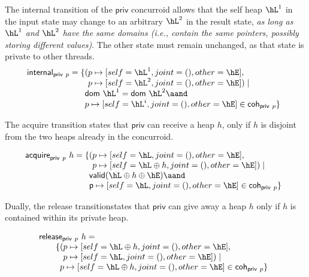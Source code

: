 The internal transition of the $\mathsf{priv}$ concurroid allows that
the self heap $\hL^1$ in the input state may change to an arbitrary
$\hL^2$ in the result state, \emph{as long as $\hL^1$ and $\hL^2$ have
  the same domains (i.e., contain the same pointers, possibly storing
  different values)}. The other state must remain unchanged, as that
state is private to other threads.
\[
\mathsf{internal}_{\mathsf{priv}\ p} = \{
\!\!\!\begin{array}[t]{l}
 (\!\!\!\begin{array}[t]{l}
    p \mapsto [self = \hL^1, joint=(), other=\hE], \\\relax
    p \mapsto [self = \hL^2, joint=(), other=\hE]) \mid 
 \end{array}\\\relax
    \mathsf{dom}\ \hL^1 = \mathsf{dom}\ \hL^2 \aand \hbox{}\\\relax
    p \mapsto [self = \hL^i, joint=(), other=\hE] \in \mathsf{coh}_{\mathsf{priv}\ p}\}
  \end{array}
\]

The acquire transition states that $\mathsf{priv}$ can receive a heap
$h$, only if $h$ is disjoint from the two heaps already in the
concurroid.

\[
\mathsf{acquire}_{\mathsf{priv}\ p}\ h = \{
\!\!\!\begin{array}[t]{l}
 (\!\!\!\begin{array}[t]{l}
    p \mapsto [self = \hL, joint=(), other=\hE], \\\relax
    p \mapsto [self = \hL \oplus h, joint=(), other=\hE]) \mid 
 \end{array}\\\relax
    \mathsf{valid} (\hL \oplus h \oplus \hE) \aand \hbox{}\\\relax
    \mathsf{p} \mapsto [self = \hL, joint=(), other=\hE] \in \mathsf{coh}_{\mathsf{priv}\ p}\}
  \end{array}
\]

Dually, the release transitionstates that $\mathsf{priv}$ can give
away a heap $h$ only if $h$ is contained within its private heap.

\[
\begin{array}{l}
\mathsf{release}_{\mathsf{priv}\ p}\ h = \\
\qquad \{
\!\!\!\begin{array}[t]{l}
 (\!\!\!\begin{array}[t]{l}
    p \mapsto [self = \hL \oplus h, joint=(), other=\hE], \\\relax
    p \mapsto [self = \hL, joint=(), other=\hE]) \mid 
 \end{array}\\\relax
    p \mapsto [self = \hL \oplus h, joint=(), other=\hE] \in \mathsf{coh}_{\mathsf{priv}\ p}\}
  \end{array}
\end{array}
\]

